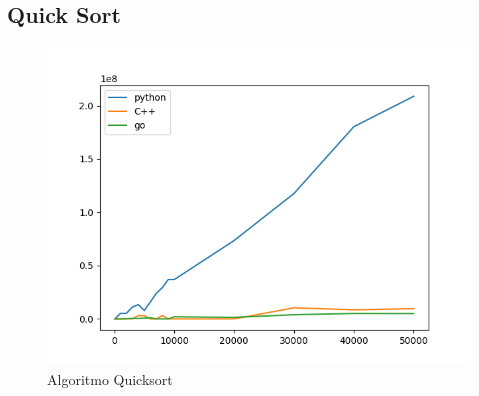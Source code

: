 \documentclass{article}
\begin{document}
\subsection{Quick Sort}
\begin{figure}[H]
	\centering
	\includegraphics[scale=0.6]{img/quicksort_1.png}
	\caption{Algoritmo Quicksort}
	\label{fig:my_label}
\end{figure}
\newpage
\end{document}
